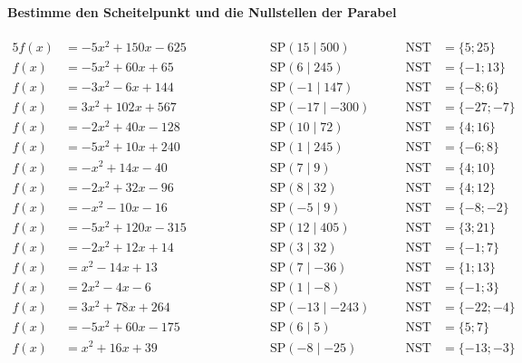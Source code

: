 \documentclass
[
  draft    = true,
  fontsize = 11pt,
  parskip  = half-,
  BCOR     = 0pt,
  DIV      = 11
]
{scrartcl}
\begin{document}
\paragraph{Bestimme den Scheitelpunkt und die Nullstellen der Parabel}
\begin{alignat*}{5}
  f(x)&=-5x^{2}+150x-625 \qquad&\qquad \quad&\text{SP}(15\mid500) \quad&\quad \text{NST}&=\{5;25\} \\[0.5ex]
  f(x)&=-5x^{2}+60x+65 \qquad&\qquad \quad&\text{SP}(6\mid245) \quad&\quad \text{NST}&=\{-1;13\} \\[0.5ex]
  f(x)&=-3x^{2}-6x+144 \qquad&\qquad \quad&\text{SP}(-1\mid147) \quad&\quad \text{NST}&=\{-8;6\} \\[0.5ex]
  f(x)&=3x^{2}+102x+567 \qquad&\qquad \quad&\text{SP}(-17\mid-300) \quad&\quad \text{NST}&=\{-27;-7\} \\[0.5ex]
  f(x)&=-2x^{2}+40x-128 \qquad&\qquad \quad&\text{SP}(10\mid72) \quad&\quad \text{NST}&=\{4;16\} \\[0.5ex]
  f(x)&=-5x^{2}+10x+240 \qquad&\qquad \quad&\text{SP}(1\mid245) \quad&\quad \text{NST}&=\{-6;8\} \\[0.5ex]
  f(x)&=-x^{2}+14x-40 \qquad&\qquad \quad&\text{SP}(7\mid9) \quad&\quad \text{NST}&=\{4;10\} \\[0.5ex]
  f(x)&=-2x^{2}+32x-96 \qquad&\qquad \quad&\text{SP}(8\mid32) \quad&\quad \text{NST}&=\{4;12\} \\[0.5ex]
  f(x)&=-x^{2}-10x-16 \qquad&\qquad \quad&\text{SP}(-5\mid9) \quad&\quad \text{NST}&=\{-8;-2\} \\[0.5ex]
  f(x)&=-5x^{2}+120x-315 \qquad&\qquad \quad&\text{SP}(12\mid405) \quad&\quad \text{NST}&=\{3;21\} \\[0.5ex]
  f(x)&=-2x^{2}+12x+14 \qquad&\qquad \quad&\text{SP}(3\mid32) \quad&\quad \text{NST}&=\{-1;7\} \\[0.5ex]
  f(x)&=x^{2}-14x+13 \qquad&\qquad \quad&\text{SP}(7\mid-36) \quad&\quad \text{NST}&=\{1;13\} \\[0.5ex]
  f(x)&=2x^{2}-4x-6 \qquad&\qquad \quad&\text{SP}(1\mid-8) \quad&\quad \text{NST}&=\{-1;3\} \\[0.5ex]
  f(x)&=3x^{2}+78x+264 \qquad&\qquad \quad&\text{SP}(-13\mid-243) \quad&\quad \text{NST}&=\{-22;-4\} \\[0.5ex]
  f(x)&=-5x^{2}+60x-175 \qquad&\qquad \quad&\text{SP}(6\mid5) \quad&\quad \text{NST}&=\{5;7\} \\[0.5ex]
  f(x)&=x^{2}+16x+39 \qquad&\qquad \quad&\text{SP}(-8\mid-25) \quad&\quad \text{NST}&=\{-13;-3\} \\[0.5ex]

\end{alignat*}
\end{document}
